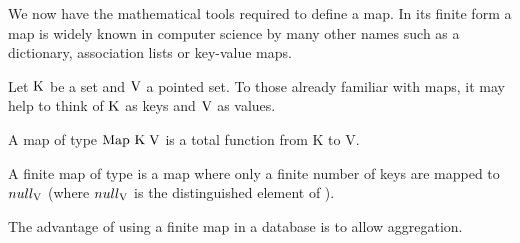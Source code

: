 
We now have the mathematical tools required to define a map. In its finite form a map is widely known in computer science by many other names such as a dictionary, association lists or key-value maps.

Let $\mathrm{K}$ be a set and $\mathrm{V}$ a pointed set. To those already familiar with maps, it may help to think of $\mathrm{K}$ as keys and $\mathrm{V}$ as values.
\begin{mapdef}
  A map of type $\mathrm{Map}\ \mathrm{K}\;\mathrm{V}$ is a total function from K to V.
\end{mapdef}
\begin{finitemapdef}
  A finite map of type \finitemap{\keyset}{\valset} is a map where only a finite number of keys are mapped to $null_{\mathrm{V}}$ (where $null_{\mathrm{V}}$ is the distinguished element of \valset). 
\end{finitemapdef}
The advantage of using a finite map in a database is to allow aggregation.
